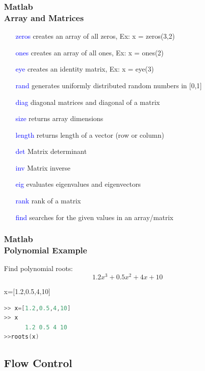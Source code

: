 \documentclass[hyperref={pdfpagelabels=true}]{beamer}
\begin{document}
\begin{frame}
\frametitle{Matlab \\ {\small Array and Matrices}}
\begin{itemize}
\item[\textcolor{blue}{zeros}] creates an array of all zeros, Ex: x = zeros(3,2)
\item[\textcolor{blue}{ones}] creates an array of all ones, Ex: x = ones(2)
\item[\textcolor{blue}{eye}] creates an identity matrix, Ex: x = eye(3)
\item[\textcolor{blue}{rand}] generates uniformly distributed random numbers in [0,1]
\item[\textcolor{blue}{diag}] diagonal matrices and diagonal of a matrix
\item[\textcolor{blue}{size}] returns array dimensions
\item[\textcolor{blue}{length}] returns length of a vector (row or column)
\item[\textcolor{blue}{det}] Matrix determinant
\item[\textcolor{blue}{inv}] Matrix inverse
\item[\textcolor{blue}{eig }] evaluates eigenvalues and eigenvectors
\item[\textcolor{blue}{rank}] rank of a matrix
\item[\textcolor{blue}{find}] searches for the given values in an array/matrix
\end{itemize}
\end{frame}

\begin{frame}[fragile]
\frametitle{Matlab \\ {\small Polynomial Example}}
Find polynomial roots:
$$1.2x^3+0.5x^2+4x+10$$
\begin{tcolorbox}[title= ,width=9.85 cm]
x=[1.2,0.5,4,10]
\begin{lstlisting}[language=C++]
>> x=[1.2,0.5,4,10]
>> x
      1.2 0.5 4 10
>>roots(x)
\end{lstlisting}
\end{tcolorbox}
\end{frame}





\subsection{Flow Control}
\end{document}
